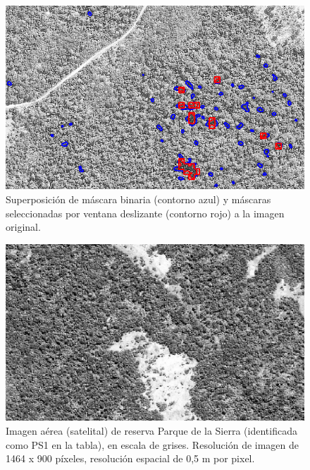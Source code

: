 \begin{figure}[h!]
    \includegraphics[width=\textwidth]{Imagenes/Homomorfico/ST2_25.png}
     \hfill
     \caption{Superposición de máscara binaria (contorno azul) y máscaras seleccionadas por ventana deslizante (contorno rojo) a la imagen original.}
    \label{ST25}
\end{figure}
\begin{figure}[h!]
    \includegraphics[width=\textwidth]{Imagenes/Homomorfico/PS1_original.jpg}
     \hfill
     \caption{Imagen aérea (satelital) de reserva Parque de la Sierra (identificada como PS1 en la tabla), en escala de grises. Resolución de imagen de 1464 x 900 píxeles, resolución espacial de 0,5 m por pixel.}
    \label{PS1}
\end{figure}

